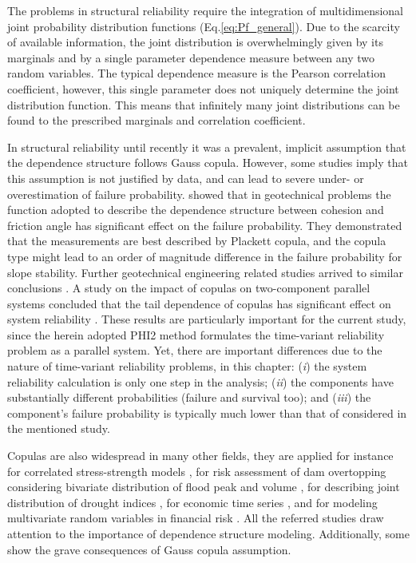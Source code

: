 The problems in structural reliability require the integration of multidimensional joint probability distribution functions (Eq.\ref{eq:Pf_general}). Due to the scarcity of available information, the joint distribution is overwhelmingly given by its marginals and by a single parameter dependence measure between any two random variables. The typical dependence measure is the Pearson correlation coefficient, however, this single parameter does not uniquely determine the joint distribution function. This means that infinitely many joint distributions can be found to the prescribed marginals and correlation coefficient.

In structural reliability until recently it was a prevalent, implicit assumption that the dependence structure follows Gauss copula. However, some studies imply that this assumption is not justified by data, and can lead to severe under- or overestimation of failure probability. \citet{Tang2013geotech} showed that in geotechnical problems the function adopted to describe the dependence structure between cohesion and friction angle has significant effect on the failure probability. They demonstrated that the measurements are best described by Plackett copula, and the copula type might lead to an order of magnitude difference in the failure probability for slope stability. Further geotechnical engineering related studies arrived to similar conclusions \citep{Li2013, Tang2015}. A study on the impact of copulas on two-component parallel systems concluded that the tail dependence of copulas has significant effect on system reliability \citep{Tang2013system}. These results are particularly important for the current study, since the herein adopted PHI2 method formulates the time-variant reliability problem as a parallel system. Yet, there are important differences due to the nature of time-variant reliability problems, in this chapter: (\textit{i}) the system reliability calculation is only one step in the analysis; (\textit{ii}) the components have substantially different probabilities (failure and survival too); and (\textit{iii}) the component's failure probability is typically much lower than that of considered in the mentioned study.

Copulas are also widespread in many other fields, they are applied for instance for correlated stress-strength models \citep{Domma2013}, for risk assessment of dam overtopping considering bivariate distribution of flood peak and volume \citep{Requena2013}, for describing joint distribution of drought indices \citep{Madadgar2011}, for economic time series \citep{Patton2012}, and for modeling multivariate random variables in financial risk \citep{Donelly2010, Romano2002}.  All the referred studies draw attention to the importance of dependence structure modeling. Additionally, some show the grave consequences of Gauss copula assumption.

